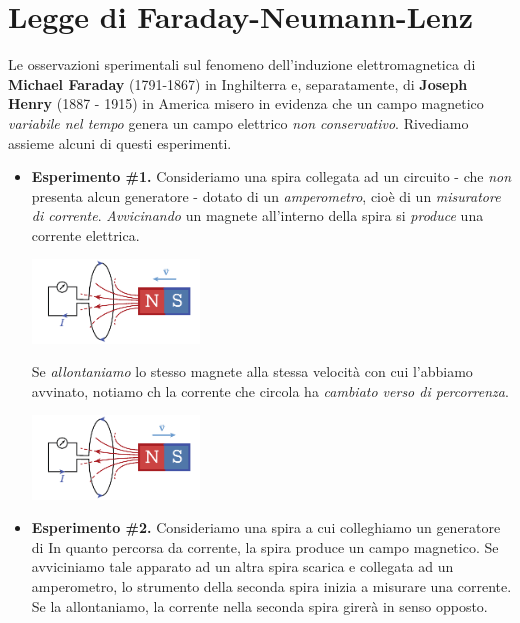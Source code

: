 \section{Legge di Faraday-Neumann-Lenz}
Le osservazioni sperimentali sul fenomeno dell'induzione elettromagnetica di \textbf{Michael Faraday} (1791-1867) in Inghilterra e, separatamente, di \textbf{Joseph Henry} (1887 - 1915) in America misero in evidenza che un campo magnetico \textit{variabile nel tempo} genera un campo elettrico \textit{non conservativo}. Rivediamo assieme alcuni di questi esperimenti.
\begin{itemize}
	\item \textbf{Esperimento \#1.} Consideriamo una spira collegata ad un circuito - che \textit{non} presenta alcun generatore - dotato di un \textit{amperometro}, cioè di un \textit{misuratore di corrente}. \textit{Avvicinando} un magnete all'interno della spira si \textit{produce} una corrente elettrica.
\begin{center}
	\includegraphics[width=0.35\textwidth]{images/chp10/chp10esperimento1a.pdf}
\end{center}
	Se \textit{allontaniamo} lo stesso magnete alla stessa velocità con cui l'abbiamo avvinato, notiamo ch la corrente che circola ha \textit{cambiato verso di percorrenza}.
\begin{center}
	\includegraphics[width=0.35\textwidth]{images/chp10/chp10esperimento1b.pdf}
\end{center}
	\item \textbf{Esperimento \#2.} Consideriamo una spira a cui colleghiamo un generatore di \fem In quanto percorsa da corrente, la spira produce un campo magnetico. Se avviciniamo tale apparato ad un altra spira scarica e collegata ad un amperometro, lo strumento della seconda spira inizia a misurare una corrente. Se la allontaniamo, la corrente nella seconda spira girerà in senso opposto.\\
	\begin{minipage}{0.49\textwidth}

\end{minipage}
\end{itemize}
